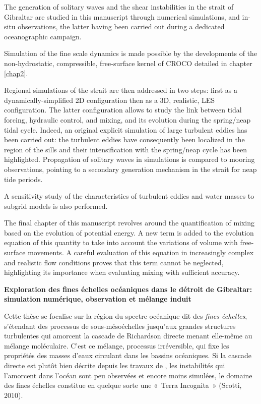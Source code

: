 \documentclass[a4paper,12pt,notitlepage,twoside]{report}
\numberwithin{equation}{section}
\begin{document}
The generation of solitary waves and the shear instabilities in the strait of Gibraltar are studied in this manuscript through numerical simulations, and in-situ observations, the latter having been carried out during a dedicated oceanographic campaign.

Simulation of the fine scale dynamics is made possible by the developments of the non-hydrostatic, compressible, free-surface kernel of CROCO detailed in chapter \ref{chap2}.

Regional simulations of the strait are then addressed in two steps: first as a dynamically-simplified 2D configuration then as a 3D, realistic, LES configuration. The latter configuration allows to study the link between tidal forcing, hydraulic control, and mixing, and its evolution during the spring/neap tidal cycle. Indeed, an original explicit simulation of large turbulent eddies has been carried out: the turbulent eddies have consequently been localized in the region of the sills and their intensification with the spring/neap cycle has been highlighted. Propagation of solitary waves in simulations is compared to mooring observations, pointing to a secondary generation mechanism in the strait for neap tide periods.

A sensitivity study of the characteristics of turbulent eddies and water masses to subgrid models is also performed.

The final chapter of this manuscript revolves around the quantification of mixing based on the evolution of potential energy. A new term is added to the evolution equation of this quantity to take into account the variations of volume with free-surface movements. A careful evaluation of this equation in increasingly complex and realistic flow conditions proves that this term cannot be neglected, highlighting its importance when evaluating mixing with sufficient accuracy.


\newpage
\thispagestyle{empty}
\begin{center}
   \textbf{Exploration des fines échelles océaniques dans le détroit de Gibraltar: simulation numérique, observation et mélange induit} 
\end{center}
Cette thèse se focalise sur la région du spectre océanique dit des \textit{fines échelles}, s'étendant des processus de sous-mésoéchelles jusqu'aux grandes structures turbulentes qui amorcent la cascade de Richardson directe menant elle-même au mélange moléculaire. C’est ce mélange, processus irréversible, qui fixe les propriétés des masses d’eaux circulant dans les bassins océaniques. Si la cascade directe est plutôt bien décrite depuis les travaux de \cite{kolmogorov_local_1941}, les instabilités qui l'amorcent dans l’océan sont peu observées et encore moins simulées, le domaine des fines échelles constitue en quelque sorte une « Terra Incognita » (Scotti, 2010).
\end{document}
